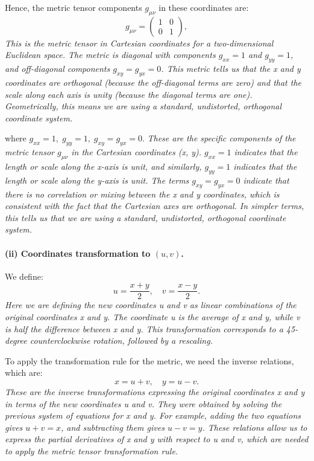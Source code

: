 Hence, the metric tensor components \(g_{\mu \nu}\) in these coordinates are:
\[
g_{\mu\nu}
=
\begin{pmatrix}
1 & 0 \\
0 & 1
\end{pmatrix},
\]
\emph{This is the metric tensor in Cartesian coordinates for a two-dimensional Euclidean space. The metric is diagonal with components \(g_{xx} = 1\) and \(g_{yy} = 1\), and off-diagonal components \(g_{xy} = g_{yx} = 0\). This metric tells us that the x and y coordinates are orthogonal (because the off-diagonal terms are zero) and that the scale along each axis is unity (because the diagonal terms are one). Geometrically, this means we are using a standard, undistorted, orthogonal coordinate system.}

where
\(\displaystyle g_{xx} = 1,\; g_{yy} = 1,\; g_{xy} = g_{yx} = 0.\)
\emph{These are the specific components of the metric tensor \(g_{\mu\nu}\) in the Cartesian coordinates (x, y). \(g_{xx} = 1\) indicates that the  length  or  scale  along the x-axis is unit, and similarly, \(g_{yy} = 1\) indicates that the  length  or  scale  along the y-axis is unit. The terms \(g_{xy} = g_{yx} = 0\) indicate that there is no correlation or  mixing  between the x and y coordinates, which is consistent with the fact that the Cartesian axes are orthogonal. In simpler terms, this tells us that we are using a standard, undistorted, orthogonal coordinate system.}

\paragraph{(ii) Coordinates transformation to \((u, v)\).}

We define:
\[
u = \frac{x+y}{2},
\quad
v = \frac{x-y}{2}.
\]
\emph{Here we are defining the new coordinates u and v as linear combinations of the original coordinates x and y. The coordinate u is the average of x and y, while v is half the difference between x and y. This transformation corresponds to a 45-degree counterclockwise rotation, followed by a rescaling.}

To apply the transformation rule for the metric, we need the inverse relations, which are:
\[
x = u + v,
\quad
y = u - v.
\]
\emph{These are the inverse transformations expressing the original coordinates x and y in terms of the new coordinates u and v. They were obtained by solving the previous system of equations for x and y. For example, adding the two equations gives \(u + v = x\), and subtracting them gives \(u - v = y\). These relations allow us to express the partial derivatives of x and y with respect to u and v, which are needed to apply the metric tensor transformation rule.}

